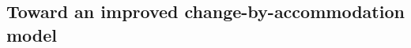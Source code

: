 \documentclass[output=paper,
modfonts
]{langscibook}
\begin{document}
% 
% 
% 
%
% 
% 
% 
%
% 
% 
% 
%

\subsection{Toward an improved change-by-accommodation model}
\end{document}
